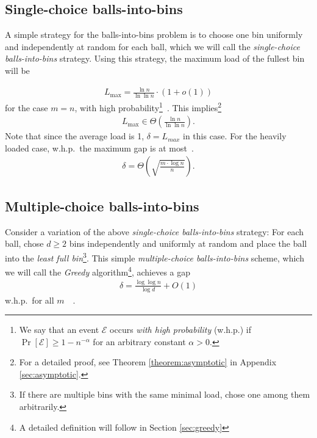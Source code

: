 \documentclass[a4paper,12pt]{article}
\newcommand\load{L_{\mathrm{max}}}
\begin{document}
\subsection{Single-choice balls-into-bins}
\label{sec:single-choice}
A simple strategy for the balls-into-bins problem is to choose one bin uniformly and independently at random for each ball, which we will call the \emph{single-choice balls-into-bins} strategy. Using this strategy, the maximum load of the fullest bin will be
\begin{comment}
\footnote{A more accurate result exists: The maximum load is $\load = \Gamma^{-1}\left(n\right)\left(1+O\left(\frac{1}{\log \Gamma^{-1}\left(n\right)}\right)\right)$ \cite{G91}.}
\end{comment}
\begin{align}
\load = \frac{\ln n}{\ln \ln n} \cdot \left(1 + o\left(1\right)\right)
\end{align}
for the case $m=n$, with high probability\footnote{We say that an event $\mathcal E$ occurs \emph{with high probability} (w.h.p.) if $\Pr\left[\mathcal E \right] \geq 1 - n^{-\alpha}$ for an arbitrary constant $\alpha > 0$.}~\cite{RS98}. This implies\footnote{For a detailed proof, see Theorem \ref{theorem:asymptotic} in Appendix \ref{sec:asymptotic}.}
\begin{align}
\load\in \Theta\left(\frac{\ln n}{\ln \ln n}\right).
\end{align}
Note that since the average load is 1, $\delta = L_{max}$ in this case. For the heavily loaded case, w.h.p.~the maximum gap is at most~\cite{RS98}.
\begin{align}
\delta = \Theta\left(\sqrt{\frac{m \cdot \log n}{n}}\right).
\end{align}

\subsection{Multiple-choice balls-into-bins}
Consider a variation of the above \emph{single-choice balls-into-bins} strategy: For each ball, chose $d \geq 2$ bins independently and uniformly at random and place the ball into the \emph{least full bin}\footnote{If there are multiple bins with the same minimal load, chose one among them arbitrarily.}. This simple \emph{multiple-choice balls-into-bins} scheme, which we will call the \emph{Greedy} algorithm\footnote{A detailed definition will follow in Section \ref{sec:greedy}}, achieves a gap
\begin{align}
\delta = \frac{\log \log n}{\log d} + O(1)
\end{align}
 w.h.p.~for all $m$~\cite{ABKU99}~\cite{BCSV06}.
 
\end{document}
